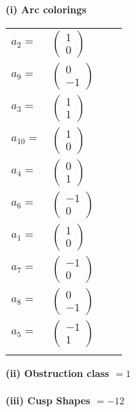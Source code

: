 \documentclass[1p]{elsarticle_modified}
\theoremstyle{definition}
\begin{document}
\flushleft \textbf{(i) Arc colorings}\\
\begin{tabular}{m{7pt} m{180pt} m{7pt} m{180pt} }
\flushright $a_{2}=$&$\begin{pmatrix}1\\0\end{pmatrix}$ \\
\flushright $a_{9}=$&$\begin{pmatrix}0\\-1\end{pmatrix}$ \\
\flushright $a_{3}=$&$\begin{pmatrix}1\\1\end{pmatrix}$ \\
\flushright $a_{10}=$&$\begin{pmatrix}1\\0\end{pmatrix}$ \\
\flushright $a_{4}=$&$\begin{pmatrix}0\\1\end{pmatrix}$ \\
\flushright $a_{6}=$&$\begin{pmatrix}-1\\0\end{pmatrix}$ \\
\flushright $a_{1}=$&$\begin{pmatrix}1\\0\end{pmatrix}$ \\
\flushright $a_{7}=$&$\begin{pmatrix}-1\\0\end{pmatrix}$ \\
\flushright $a_{8}=$&$\begin{pmatrix}0\\-1\end{pmatrix}$ \\
\flushright $a_{5}=$&$\begin{pmatrix}-1\\1\end{pmatrix}$\\&\end{tabular}
\flushleft \textbf{(ii) Obstruction class $= 1$}\\~\\
\flushleft \textbf{(iii) Cusp Shapes $= -12$}\\~\\
\end{document}
